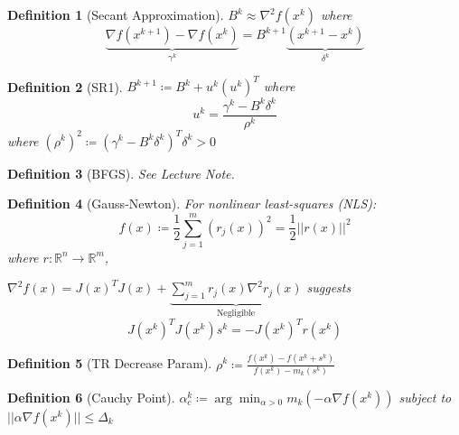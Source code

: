 \documentclass[a4paper]{article}
\newcommand{\R}{\mathbb{R}}
\newcommand{\norm}[1]{\lvert \lvert #1 \rvert \rvert}
\newtheorem*{definition*}{Definition}
\begin{document}
\begin{definition*}[Secant Approximation]
    $B^k \approx \nabla^2 f \left( x^k \right)$ where
    \begin{equation*}
        \underbrace{\nabla f \left( x^{k+1} \right) - \nabla f \left( x^k \right)}_{\gamma^k} = B^{k+1} \underbrace{\left( x^{k+1} - x^k \right)}_{\delta^k}
    \end{equation*}
\end{definition*}

\begin{definition*}[SR1]
    $B^{k+1} \coloneqq B^k + u^k \left( u^k \right)^T$ where
    \begin{equation*}
        u^k = \frac{\gamma^k - B^k \delta^k}{\rho^k}
    \end{equation*}
    where $\left( \rho^k \right)^2 \coloneqq \left( \gamma^k - B^k \delta^k \right)^T \delta^k > 0$
\end{definition*}

\begin{definition*}[BFGS]
    See Lecture Note.
\end{definition*}

\begin{definition*}[Gauss-Newton]
    For nonlinear least-squares (NLS):
    \begin{equation*}
        f(x) \coloneqq \frac{1}{2} \sum_{j=1}^m \left( r_j (x) \right)^2 = \frac{1}{2} \norm{r(x)}^2
    \end{equation*}
    where $r:\R^n \rightarrow \R^m$,

    $\nabla^{2} f (x) = J(x)^T J(x) + \underbrace{\sum_{j=1}^m r_j (x) \nabla^{2} r_j (x)}_{\text{Negligible}}$ suggests
    \begin{equation*}
        J \left( x^k \right)^T J\left( x^k \right) s^k = -J\left( x^k \right)^T r\left( x^k \right)
    \end{equation*}
\end{definition*}

\begin{definition*}[TR Decrease Param]
    $\rho^k \coloneqq \frac{f\left( x^k \right) - f\left( x^k + s^k \right)}{f\left( x^k \right) - m_k \left( s^k \right)}$
\end{definition*}

\begin{definition*}[Cauchy Point]
    $\alpha_c^k \coloneqq \arg \min_{\alpha > 0} m_{k} \left( -\alpha \nabla f \left( x^k \right) \right)$ subject to $\norm{\alpha \nabla f \left( x^k \right)} \leq \Delta_k$
\end{definition*}
\end{document}
